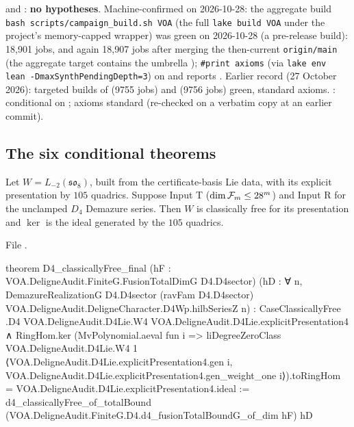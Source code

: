 \begin{status}
 and : \textbf{no hypotheses}. Machine-confirmed on 2026-10-28: the aggregate build \texttt{bash scripts/campaign\_build.sh VOA} (the full \texttt{lake build VOA} under the project's memory-capped wrapper) was green on 2026-10-28 (a pre-release build): 18{,}901 jobs, and again 18{,}907 jobs after merging the then-current \texttt{origin/main} (the aggregate target contains the umbrella ); \texttt{\#print axioms} (via \texttt{lake env lean
-DmaxSynthPendingDepth=3}) on  and
 reports . Earlier record (27 October 2026): targeted builds of  (9755 jobs) and
 (9756 jobs) green, standard axioms. : conditional on
; axioms standard (re-checked on a verbatim copy at an earlier commit).
\end{status}

\subsection{The six conditional theorems}

\begin{theorem}\label{l27:thm:D4}
Let $W=L_{-2}(\mathfrak{so}_8)$, built from the certificate-basis Lie data, with its explicit presentation by $105$ quadrics. Suppose
Input T ($\dim\mathcal F_m\le28^m$) and Input R for the unclamped $D_4$ Demazure series. Then $W$ is classically free for its
presentation and $\ker$ is the ideal generated by the $105$ quadrics.
\end{theorem}
\noindent File .
\begin{leancode}
theorem D4_classicallyFree_final (hF : VOA.DeligneAudit.FiniteG.FusionTotalDimG D4.D4sector)
    (hD : ∀ n, DemazureRealizationG D4.D4sector (ravFam D4.D4sector)
      VOA.DeligneAudit.DeligneCharacter.D4Wp.hilbSeriesZ n) :
    CaseClassicallyFree .D4 VOA.DeligneAudit.D4Lie.W4 VOA.DeligneAudit.D4Lie.explicitPresentation4 ∧
      RingHom.ker (MvPolynomial.aeval fun i =>
        liDegreeZeroClass VOA.DeligneAudit.D4Lie.W4 1
          ⟨VOA.DeligneAudit.D4Lie.explicitPresentation4.gen i,
            VOA.DeligneAudit.D4Lie.explicitPresentation4.gen_weight_one i⟩).toRingHom =
        VOA.DeligneAudit.D4Lie.explicitPresentation4.ideal :=
  d4_classicallyFree_of_totalBound (VOA.DeligneAudit.FiniteG.D4.d4_fusionTotalBoundG_of_dim hF) hD
\end{leancode}

